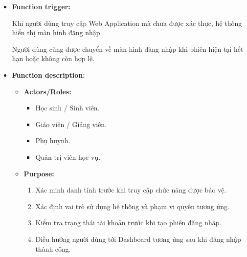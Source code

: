 \documentclass[12pt,a4paper,oneside]{report}
\begin{document}
\begin{itemize}

    \item \textbf{Function trigger:}

    Khi người dùng truy cập Web Application mà chưa được xác thực, hệ thống hiển thị màn hình đăng nhập.

    Người dùng cũng được chuyển về màn hình đăng nhập khi phiên hiện tại hết hạn hoặc không còn hợp lệ.

    \item \textbf{Function description:}

    \begin{itemize}

        \item \textbf{Actors/Roles:}
        \begin{itemize}
            \item Học sinh / Sinh viên.
            \item Giáo viên / Giảng viên.
            \item Phụ huynh.
            \item Quản trị viên học vụ.
        \end{itemize}

        \item \textbf{Purpose:}
        \begin{enumerate}
            \item Xác minh danh tính trước khi truy cập chức năng được bảo vệ.
            \item Xác định vai trò sử dụng hệ thống và phạm vi quyền tương ứng.
            \item Kiểm tra trạng thái tài khoản trước khi tạo phiên đăng nhập.
            \item Điều hướng người dùng tới Dashboard tương ứng sau khi đăng nhập thành công.
        \end{enumerate}


\end{itemize}
\end{itemize}
\end{document}
